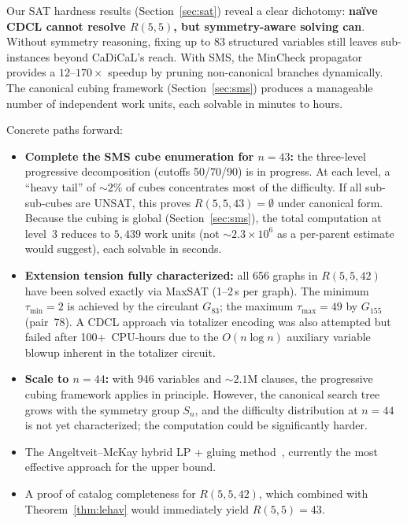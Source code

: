 \documentclass[11pt,a4paper]{article}
\theoremstyle{definition}
\theoremstyle{remark}
\newcommand{\Rset}[3]{R(#1,#2,#3)}
\begin{document}
Our SAT hardness results (Section~\ref{sec:sat}) reveal a clear
dichotomy: \textbf{na\"ive CDCL cannot resolve $R(5,5)$, but
symmetry-aware solving can}.  Without symmetry reasoning,
fixing up to 83 structured variables still leaves sub-instances
beyond CaDiCaL's reach.  With SMS, the MinCheck propagator
provides a $12$--$170\times$ speedup by pruning non-canonical
branches dynamically.  The canonical cubing framework
(Section~\ref{sec:sms}) produces a manageable number of
independent work units, each solvable in minutes to hours.

Concrete paths forward:
\begin{itemize}
  \item \textbf{Complete the SMS cube enumeration for $n = 43$:}
    the three-level progressive decomposition (cutoffs 50/70/90)
    is in progress.  At each level, a ``heavy tail'' of
    $\sim\!2\%$ of cubes concentrates most of the difficulty.
    If all sub-sub-cubes are UNSAT, this proves
    $\Rset{5}{5}{43} = \emptyset$ under canonical form.
    Because the cubing is global (Section~\ref{sec:sms}),
    the total computation at level~3 reduces to
    $5{,}439$ work units (not $\sim\!2.3 \times 10^6$
    as a per-parent estimate would suggest),
    each solvable in seconds.
  \item \textbf{Extension tension fully characterized:}
    all 656 graphs in $\Rset{5}{5}{42}$ have been solved exactly
    via MaxSAT (1--2\,s per graph).  The minimum $\tau_{\min} = 2$
    is achieved by the circulant $G_{83}$; the maximum
    $\tau_{\max} = 49$ by $G_{155}$ (pair~78).
    A CDCL approach via totalizer encoding was also attempted
    but failed after 100+~CPU-hours due to the $O(n \log n)$
    auxiliary variable blowup inherent in the totalizer circuit.
  \item \textbf{Scale to $n = 44$:} with 946 variables
    and $\sim\!2.1$M clauses, the progressive cubing framework
    applies in principle.  However, the canonical search tree
    grows with the symmetry group $S_n$, and the difficulty
    distribution at $n = 44$ is not yet characterized;
    the computation could be significantly harder.
  \item The Angeltveit--McKay hybrid LP + gluing
    method~\cite{AngeltveitMcKay2024}, currently the most
    effective approach for the upper bound.
  \item A proof of catalog completeness for $\Rset{5}{5}{42}$,
    which combined with Theorem~\ref{thm:lehav} would
    immediately yield $R(5,5) = 43$.
\end{itemize}
\end{document}
